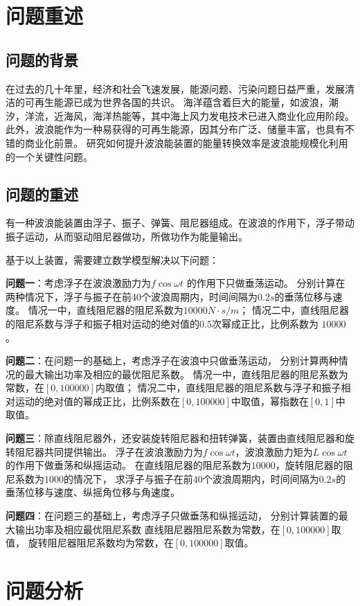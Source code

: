 \documentclass[withoutpreface,bwprint]{cumcmthesis} %
\begin{document}
    \section{问题重述}
    \subsection{问题的背景}
    在过去的几十年里，经济和社会飞速发展，能源问题、污染问题日益严重，发展清洁的可再生能源已成为世界各国的共识。
    海洋蕴含着巨大的能量，如波浪，潮汐，洋流，近海风，海洋热能等，其中海上风力发电技术已进入商业化应用阶段。
    此外，波浪能作为一种易获得的可再生能源，因其分布广泛、储量丰富，也具有不错的商业化前景。
    研究如何提升波浪能装置的能量转换效率是波浪能规模化利用的一个关键性问题。
    \subsection{问题的重述}
    有一种波浪能装置由浮子、振子、弹簧、阻尼器组成。在波浪的作用下，浮子带动振子运动，从而驱动阻尼器做功，所做功作为能量输出。
    
    基于以上装置，需要建立数学模型解决以下问题：

    \textbf{问题一}：考虑浮子在波浪激励力为$f\cos\omega t$ 的作用下只做垂荡运动。
    分别计算在两种情况下，浮子与振子在前$40$个波浪周期内，时间间隔为$0.2s$的垂荡位移与速度。
    情况一中，直线阻尼器的阻尼系数为$10000N\cdot s/m$；
    情况二中，直线阻尼器的阻尼系数与浮子和振子相对运动的绝对值的$0.5$次幂成正比，比例系数为 $10000$。

    \textbf{问题二}：在问题一的基础上，考虑浮子在波浪中只做垂荡运动，
    分别计算两种情况的最大输出功率及相应的最优阻尼系数。
    情况一中，直线阻尼器的阻尼系数为常数，在$[0, 100000]$内取值；
    情况二中，直线阻尼器的阻尼系数与浮子和振子相对运动的绝对值的幂成正比，比例系数在$[0, 100000]$中取值，幂指数在$[0, 1]$中取值。

    \textbf{问题三}：除直线阻尼器外，还安装旋转阻尼器和扭转弹簧，装置由直线阻尼器和旋转阻尼器共同提供输出。
    浮子在波浪激励力为$f\cos\omega t$，波浪激励力矩为$L\cos\omega t$ 的作用下做垂荡和纵摇运动。
    在直线阻尼器的阻尼系数为$10000$，旋转阻尼器的阻尼系数为$1000$的情况下，
    求浮子与振子在前$40$个波浪周期内，时间间隔为$0.2s$的垂荡位移与速度、纵摇角位移与角速度。

    \textbf{问题四}：在问题三的基础上，考虑浮子只做垂荡和纵摇运动，
    分别计算装置的最大输出功率及相应最优阻尼系数
    直线阻尼器阻尼系数为常数，在$[0, 100000]$取值，
    旋转阻尼器阻尼系数均为常数，在$[0, 100000]$取值。
    \section{问题分析}
\end{document}
